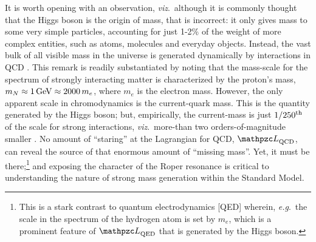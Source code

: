 It is worth opening with an observation, \emph{viz}.\ although it is commonly thought that the Higgs boson is the origin of mass, that is incorrect: it only gives mass to some very simple particles, accounting for just 1-2\% of the weight of more complex entities, such as atoms, molecules and everyday objects.  Instead, the vast bulk of all visible mass in the universe is generated dynamically by interactions in QCD \cite{Wilczek:2012sb}.  This remark is readily substantiated by noting that the mass-scale for the spectrum of strongly interacting matter is characterized by the proton's mass, $m_N \approx 1\,{\rm GeV} \approx 2000\,m_e$, where $m_e$ is the electron mass.  However, the only apparent scale in chromodynamics is the current-quark mass.  This is the quantity generated by the Higgs boson; but, empirically, the current-mass is just $1/250^{\rm th}$ of the scale for strong interactions, \emph{viz}.\ more-than two orders-of-magnitude smaller \cite{Olive:2016xmw}.  No amount of ``staring'' at the Lagrangian for QCD, ${\mathpzc L}_{\rm QCD}$, can reveal the source of that enormous amount of ``missing mass''.  Yet, it must be there;\footnote{This is a stark contrast to quantum electrodynamics [QED] wherein, \emph{e.g}.\ the scale in the spectrum of the hydrogen atom is set by $m_e$, which is a prominent feature of ${\mathpzc L}_{\rm QED}$ that is generated by the Higgs boson.}  and exposing the character of the Roper resonance is critical to understanding the nature of strong mass generation within the Standard Model.

